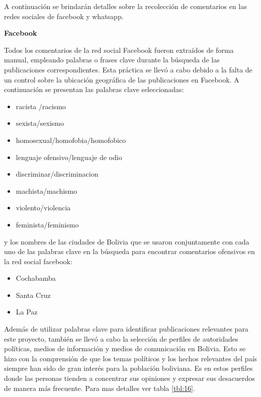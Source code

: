 A continuación se brindarán detalles sobre la recolección de comentarios en las redes sociales de facebook y whatsapp.

\textbf{Facebook}

Todos los comentarios de la red social Facebook fueron extraídos de forma manual, empleando palabras o frases clave durante la búsqueda de las publicaciones correspondientes. Esta práctica se llevó a cabo debido a la falta de un control sobre la ubicación geográfica de las publicaciones en Facebook. A continuación se presentan las palabras clave seleccionadas:
\begin{itemize}
	\item racista /racismo
	\item sexista/sexismo
	\item homosexual/homofobia/homofobico
	\item lenguaje ofensivo/lenguaje de odio 
	\item discriminar/discriminacion
	\item machista/machismo
	\item violento/violencia
	\item feminista/feminismo  
\end{itemize}
y los nombres de las ciudades de Bolivia que se usaron conjuntamente con cada uno de las palabras clave en la búsqueda para encontrar comentarios ofensivos en la red social facebook:
\begin{itemize}
	\item Cochabamba
	\item Santa Cruz
	\item La Paz
	
\end{itemize}

Además de utilizar palabras clave para identificar publicaciones relevantes para este proyecto, también se llevó a cabo la selección de perfiles de autoridades políticas, medios de información y medios de comunicación en Bolivia. Esto se hizo con la comprensión de que los temas políticos y los hechos relevantes del país siempre han sido de gran interés para la población boliviana. Es en estos perfiles donde las personas tienden a concentrar sus opiniones y expresar sus desacuerdos de manera más frecuente. Para mas detalles ver tabla \ref{tbl:16}.


